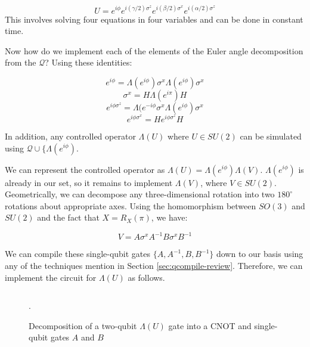\begin{equation*}
U = e^{i\phi}e^{i(\gamma/2)\sigma^z}e^{i(\beta/2)\sigma^x}e^{i(\alpha/2)\sigma^z}
\end{equation*}
This involves solving four equations in four variables and can be done in
constant time.

Now how do we implement each of the elements of the Euler angle decomposition from
the $\mathcal{Q}$? Using these identities:

\begin{equation*}
e^{i\phi} = \Lambda(e^{i\phi})\sigma^x\Lambda(e^{i\phi})\sigma^x
\end{equation*}
\begin{equation*}
\sigma^x = H\Lambda(e^{i\pi})H
\end{equation*}
\begin{equation*}
e^{i\phi\sigma^z} = \Lambda(e^{-i\phi}\sigma^x\Lambda(e^{i\phi})\sigma^x
\end{equation*}
\begin{equation*}
e^{i\phi\sigma^x} = H e^{i\phi\sigma^z} H
\end{equation*}

In addition,
any controlled operator $\Lambda(U)$ where $U \in SU(2)$ can be simulated
using
$\mathcal{Q} \cup \{ \Lambda(e^{i\phi})$.

We can represent the controlled operator as $\Lambda(U) = \Lambda(e^{i\phi})\Lambda(V)$.
$\Lambda(e^{i\phi})$ is already in our set, so it remains to implement
$\Lambda(V)$, where $V \in SU(2)$. Geometrically, we can decompose any
three-dimensional rotation into two $180^{\circ}$ rotations about appropriate
axes. Using the homomorphism between $SO(3)$ and $SU(2)$ and the fact that
$X = R_X(\pi)$, we have:

\begin{equation*}
V = A\sigma^x A^{-1} B\sigma^x B^{-1}
\end{equation*}

We can compile these single-qubit gates $\{A, A^{-1}, B, B^{-1}\}$ down
to our basis using any of the techniques mention in Section \ref{sec:qcompile-review}.
Therefore, we can implement the circuit for $\Lambda(U)$ as follows.

\begin{figure}[hbt]
\begin{displaymath}
\end{displaymath}
\label{fig:controlled-u}
\caption{Decomposition of a two-qubit $\Lambda(U)$ gate into a CNOT and
single-qubit gates $A$ and $B$}.
\end{figure}

